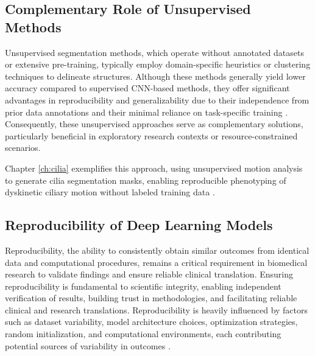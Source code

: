 \documentclass[./dissertation.tex]{subfiles}
\begin{document}
\subsection{Complementary Role of Unsupervised Methods}
Unsupervised segmentation methods, which operate without annotated datasets or extensive pre-training, typically employ domain-specific heuristics or clustering techniques to delineate structures. Although these methods generally yield lower accuracy compared to supervised CNN-based methods, they offer significant advantages in reproducibility and generalizability due to their independence from prior data annotations and their minimal reliance on task-specific training \cite{ji2019invariant}. Consequently, these unsupervised approaches serve as complementary solutions, particularly beneficial in exploratory research contexts or resource-constrained scenarios.

Chapter \ref{ch:cilia} exemplifies this approach, using unsupervised motion analysis to generate cilia segmentation masks, enabling reproducible phenotyping of dyskinetic ciliary motion without labeled training data \cite{vaezi2024training}.


\subsection{Reproducibility of Deep Learning Models}
Reproducibility, the ability to consistently obtain similar outcomes from identical data and computational procedures, remains a critical requirement in biomedical research to validate findings and ensure reliable clinical translation. Ensuring reproducibility is fundamental to scientific integrity, enabling independent verification of results, building trust in methodologies, and facilitating reliable clinical and research translations. Reproducibility is heavily influenced by factors such as dataset variability, model architecture choices, optimization strategies, random initialization, and computational environments, each contributing potential sources of variability in outcomes \cite{maier2018rankings}.
\end{document}
